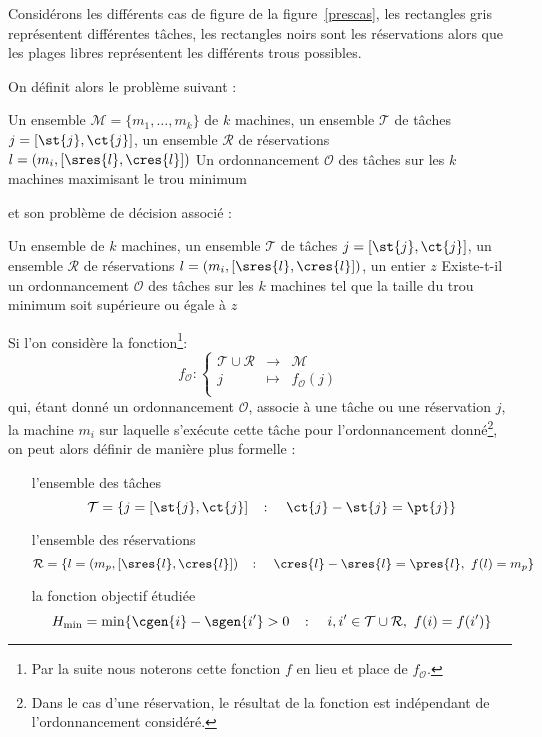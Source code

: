 \documentclass[a4paper,11pt]{thesis}
\begin{document}
\begin{nrmq}
    Considérons les différents cas de figure de la figure~\ref{prescas}, les rectangles gris
    représentent différentes tâches, les rectangles noirs sont les réservations alors que les plages
    libres représentent les différents trous possibles.
\end{nrmq}

On définit alors le problème suivant :

\dfopt{\fisched}
{Un ensemble $\mathcal{M} = \{m_1, \dots, m_k\}$ de $k$ machines, un ensemble $\mathcal{T}$ de
    tâches $j = [\st{j}, \ct{j}]$, un ensemble $\mathcal{R}$ de
    réservations $l = (m_i, [\sres{l}, \cres{l}])$}
    {Un ordonnancement $\mathcal{O}$ des tâches sur les $k$ machines maximisant le trou minimum}

et son problème de décision associé :

\dfpb{\fischedpi}
{Un ensemble de $k$ machines, un ensemble $\mathcal{T}$ de tâches $j = [\st{j}, \ct{j}]$, un
    ensemble $\mathcal{R}$ de
        réservations $l = (m_i, [\sres{l}, \cres{l}])$, un entier $z$}
        {Existe-t-il un ordonnancement $\mathcal{O}$ des tâches sur les $k$ machines tel que la taille du trou
        minimum soit supérieure ou égale à $z$}

\begin{nrmq}
    Si l'on considère la fonction\footnote{Par la suite nous noterons cette fonction $f$ en lieu et
    place de $f_{\mathcal{O}}$.}: \[
        f_{\mathcal{O}} : \left \lbrace \begin{array}{rcl}
            \mathcal{T} \cup \mathcal{R} & \longrightarrow & \mathcal{M} \\
            j & \mapsto & f_{\mathcal{O}}(j) \\
        \end{array}
        \right .
    \]
    qui, étant donné un ordonnancement $\mathcal{O}$, associe à une tâche ou une réservation $j$, la
    machine $m_i$ sur laquelle s'exécute cette tâche pour l'ordonnancement donné\footnote{Dans le
    cas d'une réservation, le résultat de la fonction est indépendant de l'ordonnancement
    considéré.}, on peut alors définir de manière plus formelle : \begin{itemize}
        \item[l'ensemble des tâches] \[
                \mathcal{T} = \{j = [\st{j}, \ct{j}] \quad \colon \quad \ct{j} - \st{j} = \pt{j} \}
            \]
        \item[l'ensemble des réservations] \[
                \mathcal{R} = \{l = (m_p, [\sres{l}, \cres{l}]) \quad \colon \quad \cres{l} -
                \sres{l} = \pres{l},\ f(l) = m_p\}
            \]
        \item[la fonction objectif étudiée] \[
                H_{\min} = \min \{ \cgen{i} - \sgen{i'} > 0 \quad \colon \quad i,i' \in
                \mathcal{T} \cup \mathcal{R},\ f(i) = f(i')\}
            \]
    \end{itemize}
\end{nrmq}
\end{document}
